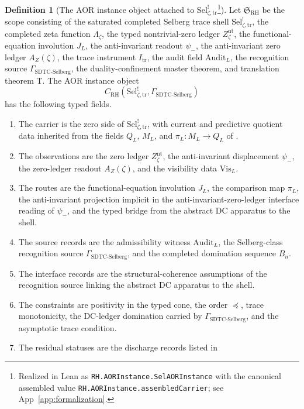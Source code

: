 \documentclass[11pt]{article}
\newcommand{\JL}{J_{L}}
\newcommand{\psimRH}{\psi_{-}}
\newcommand{\Lzeta}{\Lambda_{\zeta}}
\newcommand{\Znt}{Z_{\zeta}^{\mathrm{nt}}}
\newcommand{\AZ}{A_{Z}(\zeta)}
\newcommand{\Sel}{\mathrm{Sel}^{!}_{\zeta,\mathrm{tr}}}
\newcommand{\Itr}{I_{\mathrm{tr}}}
\newcommand{\GamSDTCSelberg}{\Gamma_{\mathrm{SDTC\text{-}Selberg}}}
\theoremstyle{definition}
\newtheorem{definition}[theorem]{Definition}
\begin{document}
\begin{definition}[The AOR instance object attached to \(\Sel\)\footnote{Realized in Lean as \nolinkurl{RH.AORInstance.SelAORInstance} with the canonical assembled value \nolinkurl{RH.AORInstance.assembledCarrier}; see App~\ref{app:formalization}.}]
\label{def:rh:aor-sel-instance}
Let \(\mathfrak S_{\mathrm{RH}}\) be the scope consisting of the
saturated completed Selberg trace shell \(\Sel\), the completed zeta
function \(\Lzeta\), the typed nontrivial-zero ledger \(\Znt\), the
functional-equation involution \(\JL\), the anti-invariant readout
\(\psimRH\), the anti-invariant zero ledger \(\AZ\), the trace
instrument \(\Itr\), the audit field \(\mathrm{Audit}_{L}\), the
recognition source \(\GamSDTCSelberg\), the duality-confinement
master theorem, and translation theorem T.  The AOR instance object
\[
  C_{\mathrm{RH}}(\Sel,\GamSDTCSelberg)
\]
has the following typed fields.
\begin{enumerate}[label=\textup{(\arabic*)}]
  \item The carrier is the zero side of \(\Sel\), with current and
        predictive quotient data inherited from the fields \(Q_L\),
        \(M_L\), and \(\pi_L:M_L\to Q_L\) of
        .
  \item The observations are the zero ledger \(\Znt\), the
        anti-invariant displacement \(\psimRH\), the zero-ledger
        readout \(\AZ\), and the visibility data \(\mathrm{Vis}_{L}\).
  \item The routes are the functional-equation involution \(\JL\), the
        comparison map \(\pi_L\), the anti-invariant projection
        implicit in the anti-invariant-zero-ledger interface reading
        of \(\psimRH\), and the typed bridge from the
        abstract DC apparatus to the shell.
  \item The source records are the admissibility witness
        \(\mathrm{Audit}_{L}\), the Selberg-class recognition source
        \(\GamSDTCSelberg\), and the completed domination sequence
        \(B_n\).
  \item The interface records are the structural-coherence assumptions
        of the recognition source linking the abstract DC apparatus to
        the shell.
  \item The constraints are positivity in the typed cone, the order
        \(\preceq\), trace monotonicity, the DC-ledger domination
        carried by \(\GamSDTCSelberg\), and the asymptotic trace
        condition.
  \item The residual statuses are the discharge records listed in

\end{enumerate}
\end{definition}
\end{document}
